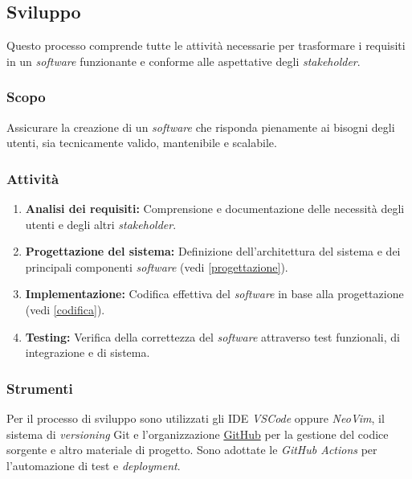 \subsection{Sviluppo}

Questo processo comprende tutte le attività necessarie per trasformare i
requisiti in un \textit{software} funzionante e conforme alle aspettative degli
\textit{stakeholder}.

\subsubsection{Scopo}
Assicurare la creazione di un \textit{software} che risponda pienamente ai
bisogni degli utenti, sia tecnicamente valido, mantenibile e scalabile.

\subsubsection{Attività}
\begin{enumerate}
	\item \textbf{Analisi dei requisiti:} Comprensione e documentazione delle
	      necessità degli utenti e degli altri \textit{stakeholder}.
	\item \textbf{Progettazione del sistema:} Definizione dell'architettura del
	      sistema e dei principali componenti \textit{software} (vedi
	      \autoref{progettazione}).
	\item \textbf{Implementazione:} Codifica effettiva del \textit{software} in
	      base alla progettazione (vedi \autoref{codifica}).
	\item \textbf{Testing:} Verifica della correttezza del \textit{software}
	      attraverso test funzionali, di integrazione e di sistema.
\end{enumerate}

\subsubsection{Strumenti}
Per il processo di sviluppo sono utilizzati gli IDE \textit{VSCode} oppure
\textit{NeoVim}, il sistema di \textit{versioning} Git e l'organizzazione
\href{https://github.com/Project-SWEnergy}{GitHub} per la gestione del codice
sorgente e altro materiale di progetto. Sono adottate le \textit{GitHub Actions}
per l'automazione di test e \textit{deployment}.
